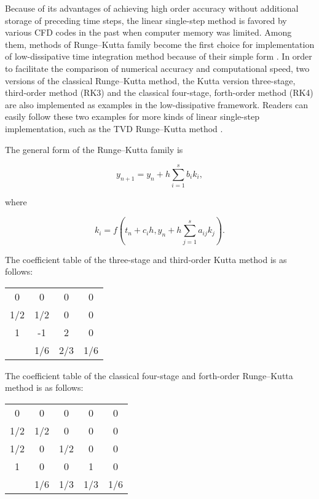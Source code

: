 \documentclass{article}
\begin{document}
Because of its advantages of achieving high order accuracy without additional storage of preceding time steps, the linear single-step method is favored by various CFD codes in the past when computer memory was limited. Among them, methods of Runge--Kutta family become the first choice for implementation of low-dissipative time integration method because of their simple form \citep{Komen:2021,Vuorinen:2014}. In order to facilitate the comparison of numerical accuracy and computational speed, two versions of the classical Runge--Kutta method, the Kutta version three-stage, third-order method (RK3) and the classical four-stage, forth-order method (RK4) are also implemented as examples in the low-dissipative framework. Readers can easily follow these two examples for more kinds of linear single-step implementation, such as the TVD Runge--Kutta method \citep{Shu:1988:2}.

The general form of the Runge--Kutta family is

\begin{equation}
  y_{n+1} = y_n + h \sum_{i=1}^{s} b_i k_i,
\end{equation}

where

\begin{equation}
  k_i = f \left( t_n + c_i h, y_n + h \sum_{j=1}^{s} a_{ij} k_j \right).
\end{equation}

The coefficient table of the three-stage and third-order Kutta method is as follows:

\begin{center}
  \begin{tabular}{c|ccc}
    0   & 0   & 0   & 0   \\
    1/2 & 1/2 & 0   & 0   \\
    1   & -1  & 2   & 0   \\ \hline
        & 1/6 & 2/3 & 1/6
  \end{tabular}
\end{center}

The coefficient table of the classical four-stage and forth-order Runge--Kutta method is as follows:

\begin{center}
  \begin{tabular}{c|cccc}
    0   & 0   & 0   & 0   & 0   \\
    1/2 & 1/2 & 0   & 0   & 0   \\
    1/2 & 0   & 1/2 & 0   & 0   \\
    1   & 0   & 0   & 1   & 0   \\ \hline
        & 1/6 & 1/3 & 1/3 & 1/6
  \end{tabular}
\end{center}
\end{document}

